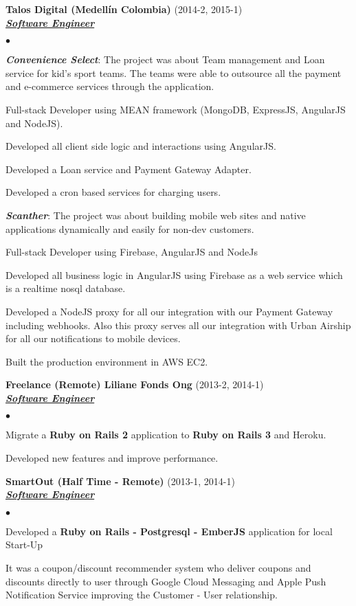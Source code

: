 \documentclass[a4paper]{article}
\newcommand{\employer}[3]{{
\textbf{#1} (#2)\\ \underline{\textbf{\emph{#3}}}\\ }}
\newenvironment{achievements}{\begin{list}{$\bullet$}{\topsep 0pt \itemsep
-2pt}}{\vspace*{4pt}\end{list}}
\newcommand{\programming}[1]{{\textbf{#1}}}
\newcommand{\emphasys}[1]{\textbf{\emph{#1}}}
\begin{document}
\employer{ Talos Digital (Medell\'in Colombia)}{2014-2, 2015-1}{Software Engineer}
\begin{achievements}
\item \emphasys{Convenience Select}: The project was about Team management and Loan service for kid's sport teams. The teams were able to outsource all the payment and e-commerce services through the application.
\item Full-stack Developer using MEAN framework  (MongoDB, ExpressJS, AngularJS and NodeJS).
\item Developed all client side logic and interactions using AngularJS.
\item Developed a Loan service and Payment Gateway Adapter.
\item Developed a cron based services for charging users.
\item \emphasys{Scanther}: The project was about building mobile web sites and native applications dynamically and easily for non-dev customers.
\item Full-stack Developer using Firebase, AngularJS and NodeJs
\item Developed all business logic in AngularJS using Firebase as a web service which is a realtime nosql database.
\item Developed a NodeJS proxy for all our integration with our Payment Gateway including webhooks. Also this proxy serves all our integration with Urban Airship for all our notifications to mobile devices.
\item Built the production environment in AWS EC2.
\end{achievements}

\employer{ Freelance (Remote)  Liliane Fonds Ong}{2013-2, 2014-1}{Software Engineer}
\begin{achievements}
\item Migrate a \programming{Ruby on Rails 2} application to \programming{Ruby on Rails 3} and Heroku.
\item Developed new features and improve performance.
\end{achievements}

\employer{ SmartOut (Half Time - Remote)}{2013-1, 2014-1}{Software Engineer}
\begin{achievements}
\item Developed a \programming{Ruby on Rails - Postgresql - EmberJS} application for local Start-Up
\item It was a coupon/discount recommender system who deliver coupons and discounts directly to user through Google Cloud Messaging and Apple Push Notification Service improving the Customer - User relationship.
\end{achievements}
\end{document}
